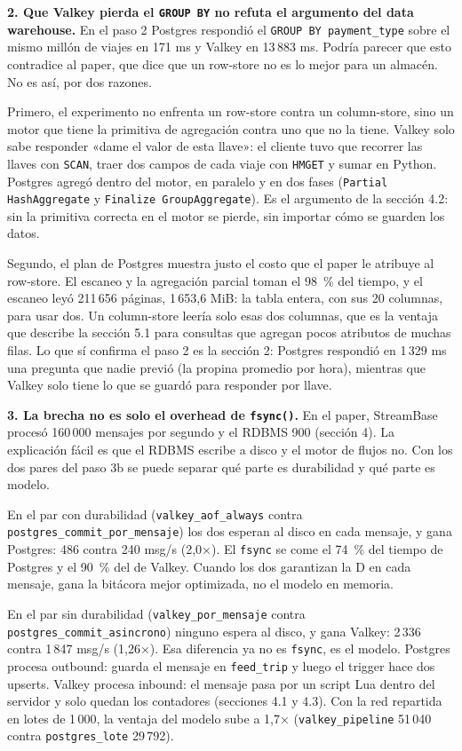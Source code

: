 \documentclass[10pt,letterpaper]{article}
\begin{document}
\textbf{2. Que Valkey pierda el \texttt{GROUP BY} no refuta el argumento del data warehouse.} En el paso
2 Postgres respondió el \texttt{GROUP BY payment\_type} sobre el mismo millón de viajes en 171 ms y Valkey
en 13\,883 ms. Podría parecer que esto contradice al paper, que dice que un row-store no es lo mejor para
un almacén. No es así, por dos razones.

Primero, el experimento no enfrenta un row-store contra un column-store, sino un motor que tiene la
primitiva de agregación contra uno que no la tiene. Valkey solo sabe responder «dame el valor de esta
llave»: el cliente tuvo que recorrer las llaves con \texttt{SCAN}, traer dos campos de cada viaje con
\texttt{HMGET} y sumar en Python. Postgres agregó dentro del motor, en paralelo y en dos fases
(\texttt{Partial HashAggregate} y \texttt{Finalize GroupAggregate}). Es el argumento de la sección 4.2:
sin la primitiva correcta en el motor se pierde, sin importar cómo se guarden los datos.

Segundo, el plan de Postgres muestra justo el costo que el paper le atribuye al row-store. El escaneo y
la agregación parcial toman el 98~\% del tiempo, y el escaneo leyó 211\,656 páginas, 1\,653,6 MiB: la
tabla entera, con sus 20 columnas, para usar dos. Un column-store leería solo esas dos columnas, que es
la ventaja que describe la sección 5.1 para consultas que agregan pocos atributos de muchas filas. Lo que
sí confirma el paso 2 es la sección 2: Postgres respondió en 1\,329 ms una pregunta que nadie previó (la
propina promedio por hora), mientras que Valkey solo tiene lo que se guardó para responder por llave.

\textbf{3. La brecha no es solo el overhead de \texttt{fsync()}.} En el paper, StreamBase procesó
160\,000 mensajes por segundo y el RDBMS 900 (sección 4). La explicación fácil es que el RDBMS escribe a
disco y el motor de flujos no. Con los dos pares del paso 3b se puede separar qué parte es durabilidad y
qué parte es modelo.

En el par con durabilidad (\texttt{valkey\_aof\_always} contra \texttt{postgres\_commit\_por\_mensaje})
los dos esperan al disco en cada mensaje, y gana Postgres: 486 contra 240 msg/s (2,0×). El
\texttt{fsync} se come el 74~\% del tiempo de Postgres y el 90~\% del de Valkey. Cuando los dos
garantizan la D en cada mensaje, gana la bitácora mejor optimizada, no el modelo en memoria.

En el par sin durabilidad (\texttt{valkey\_por\_mensaje} contra \texttt{postgres\_commit\_asincrono})
ninguno espera al disco, y gana Valkey: 2\,336 contra 1\,847 msg/s (1,26×). Esa diferencia ya no es
\texttt{fsync}, es el modelo. Postgres procesa outbound: guarda el mensaje en \texttt{feed\_trip} y luego
el trigger hace dos upserts. Valkey procesa inbound: el mensaje pasa por un script Lua dentro del
servidor y solo quedan los contadores (secciones 4.1 y 4.3). Con la red repartida en lotes de 1\,000, la
ventaja del modelo sube a 1,7× (\texttt{valkey\_pipeline} 51\,040 contra \texttt{postgres\_lote}
29\,792).
\end{document}
